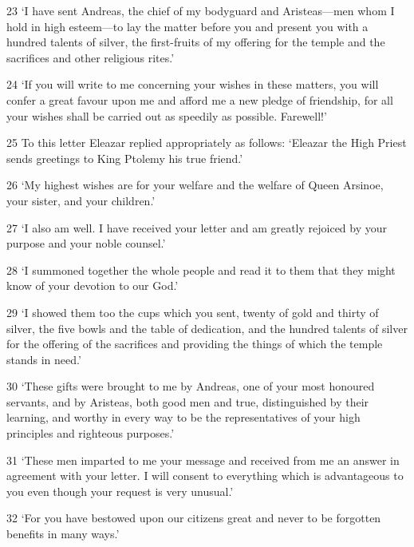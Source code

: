 \par 23 ‘I have sent Andreas, the chief of my bodyguard and Aristeas—men whom I hold in high esteem—to lay the matter before you and present you with a hundred talents of silver, the first-fruits of my offering for the temple and the sacrifices and other religious rites.’

\par 24 ‘If you will write to me concerning your wishes in these matters, you will confer a great favour upon me and afford me a new pledge of friendship, for all your wishes shall be carried out as speedily as possible. Farewell!’

\par 25 To this letter Eleazar replied appropriately as follows: ‘Eleazar the High Priest sends greetings to King Ptolemy his true friend.’

\par 26 ‘My highest wishes are for your welfare and the welfare of Queen Arsinoe, your sister, and your children.’

\par 27 ‘I also am well. I have received your letter and am greatly rejoiced by your purpose and your noble counsel.’

\par 28 ‘I summoned together the whole people and read it to them that they might know of your devotion to our God.’

\par 29 ‘I showed them too the cups which you sent, twenty of gold and thirty of silver, the five bowls and the table of dedication, and the hundred talents of silver for the offering of the sacrifices and providing the things of which the temple stands in need.’

\par 30 ‘These gifts were brought to me by Andreas, one of your most honoured servants, and by Aristeas, both good men and true, distinguished by their learning, and worthy in every way to be the representatives of your high principles and righteous purposes.’

\par 31 ‘These men imparted to me your message and received from me an answer in agreement with your letter. I will consent to everything which is advantageous to you even though your request is very unusual.’

\par 32 ‘For you have bestowed upon our citizens great and never to be forgotten benefits in many ways.’

